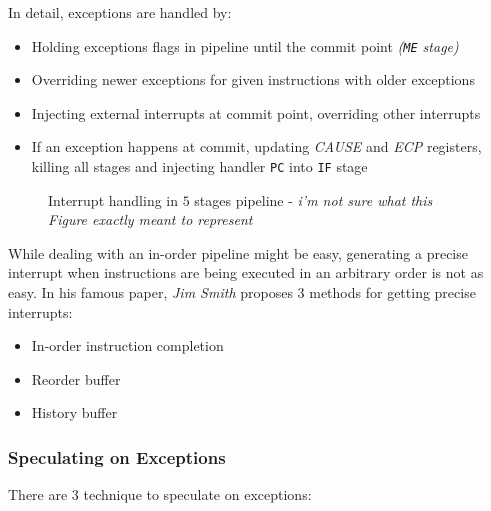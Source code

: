 \documentclass[english]{article}
\begin{document}
\bigskip
In detail, exceptions are handled by:

\begin{itemize}
  \item Holding exceptions flags in pipeline until the commit point \textit{(\texttt{ME} stage)}
  \item Overriding newer exceptions for given instructions with older exceptions
  \item Injecting external interrupts at commit point, overriding other interrupts
  \item If an exception happens at commit, updating \textit{CAUSE} and \textit{ECP} registers, killing all stages and injecting handler \texttt{PC} into \texttt{IF} stage
\end{itemize}

\begin{figure}[htbp]
  \bigskip
  \centering
  \caption{Interrupt handling in \(5\) stages pipeline - \textit{i'm not sure what this Figure exactly meant to represent}}
  \label{fig:interrupt-handling-5-stages-pipeline}
  \bigskip
\end{figure}

While dealing with an in-order pipeline might be easy, generating a precise interrupt when instructions are being executed in an arbitrary order is not as easy.
In his famous paper, \textit{Jim Smith} proposes \(3\) methods for getting precise interrupts:

\begin{itemize}
  \item In-order instruction completion
  \item Reorder buffer
  \item History buffer
\end{itemize}

\subsubsection{Speculating on Exceptions}

There are \(3\) technique to speculate on exceptions:
\end{document}
